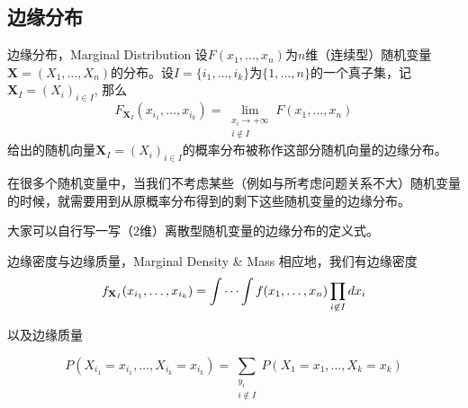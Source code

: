 
\subsection{边缘分布}


\begin{frame}

\begin{block}{边缘分布，Marginal Distribution}
设$F(x_1,\ldots,x_n)$为$n$维（连续型）随机变量$\mathbf{X} = (X_1,\ldots,X_n)$的分布。设$I = \{i_1,\ldots,i_k\}$为$\{1,\ldots,n\}$的一个真子集，记$\mathbf{X}_I = (X_i)_{i\in I}$, 那么
$$F_{\mathbf{X}_I}(x_{i_1},\ldots,x_{i_k}) = \lim\limits_{\substack{x_i\to+\infty \\ i\not\in I}} F(x_1,\ldots,x_n)$$
给出的随机向量$\mathbf{X}_I = (X_i)_{i\in I}$的概率分布被称作这部分随机向量的边缘分布。

\vspace{1em}

在很多个随机变量中，当我们不考虑某些（例如与所考虑问题关系不大）随机变量的时候，就需要用到从原概率分布得到的剩下这些随机变量的边缘分布。

\vspace{1em}

大家可以自行写一写（$2$维）离散型随机变量的边缘分布的定义式。
\end{block}

\end{frame}


\begin{frame}

\begin{block}{边缘密度与边缘质量，Marginal Density \& Mass}
相应地，我们有边缘密度
$$f_{\mathbf{X}_I}(x_{i_1},\ldots,x_{i_k}) = \idotsint f(x_1,\ldots,x_n) \prod\limits_{i\not\in I}dx_i$$

以及边缘质量

$$P(X_{i_1}=x_{i_1},\ldots,X_{i_k}=x_{i_k}) = \sum\limits_{\substack{y_i\\i\not\in I}} P(X_1=x_1,\ldots,X_k=x_k) $$
\end{block}

\end{frame}


